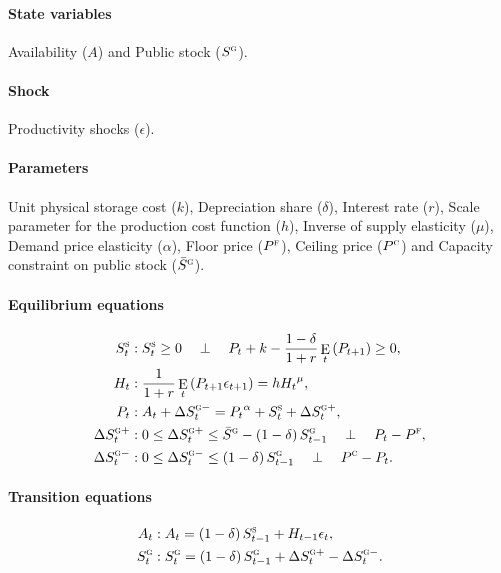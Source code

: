\documentclass[11pt,fleqn]{article}
\DeclareMathOperator{\E}{E}
\newcommand{\Ss}{S^{\textsc{s}}}
\newcommand{\Sg}{S^{\textsc{g}}}
\newcommand{\PF}{P^{\textsc{f}}}
\newcommand{\Sgb}{\bar{S}^{\textsc{g}}}
\newcommand{\PC}{P^{\textsc{c}}}
\newcommand{\CP}{\quad \perp \quad}
\newcommand{\dSp}[1]{\Delta S^{\textsc{g}+}_{#1}}
\newcommand{\dSm}[1]{\Delta S^{\textsc{g}-}_{#1}}
\begin{document}
\paragraph{State variables}
\label{sec:state-variable}

Availability ($A$) and Public stock ($\Sg$).

\paragraph{Shock}
\label{sec:shock}

Productivity shocks ($\epsilon$).

\paragraph{Parameters}
\label{sec:parameters}

Unit physical storage cost ($k$), Depreciation share ($\delta$), Interest rate
($r$), Scale parameter for the production cost function ($h$), Inverse of supply
elasticity ($\mu$), Demand price elasticity ($\alpha$), Floor price ($\PF$),
Ceiling price ($\PC$) and Capacity constraint on public stock ($\Sgb$).

\paragraph{Equilibrium equations}
\label{sec:equil-equat}

\begin{align}
  \Ss_{t}&: \Ss_{t}\ge 0 \CP P_{t}+k-\frac{1-\delta}{1+r}\E_{t}\left(P_{t+1}\right)\ge 0,\\
  H_{t}&: \frac{1}{1+r}\E_{t}\left(P_{t+1}\epsilon_{t+1}\right)=h {H_{t}}^{\mu},\\
  P_{t}&: A_{t}+\dSm{t}={P_{t}}^{\alpha}+\Ss_{t}+\dSp{t},\\
  \dSp{t}&:0\le\dSp{t}\le\Sgb-\left(1-\delta\right)\Sg_{t-1} \CP P_{t}-\PF,\\
  \dSm{t}&:0\le\dSm{t}\le\left(1-\delta\right)\Sg_{t-1} \CP \PC-P_{t}.
\end{align}

\paragraph{Transition equations}
\label{sec:transition-equation}

\begin{align}
  A_{t}&: A_{t}=\left(1-\delta\right)\Ss_{t-1}+H_{t-1}\epsilon_{t},\\
  \Sg_{t}&: \Sg_{t}= \left(1-\delta\right)\Sg_{t-1}+\dSp{t}-\dSm{t}.
\end{align}
\end{document}
